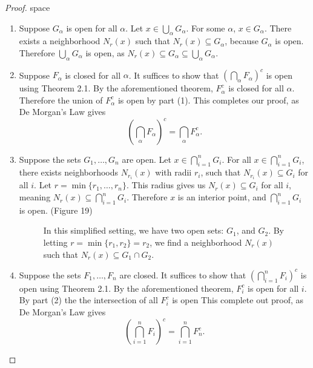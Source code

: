 \documentclass{article}
\theoremstyle{definition}
\begin{document}
\begin{proof}{\color{white}space}
	\begin{enumerate}
		\item Suppose $ G_\alpha $ is open for all $ \alpha $. Let $ x\in \bigcup_\alpha G_\alpha $. For some $ \alpha $, $ x\in G_\alpha $. There exists a neighborhood $ N_r(x) $ such that $ N_r(x)\subseteq G_\alpha $, because $ G_\alpha $ is open. Therefore $ \bigcup_\alpha G_\alpha $ is open, as $ N_r(x)\subseteq G_\alpha\subseteq \bigcup_\alpha G_\alpha $. 
		\item Suppose $ F_\alpha $ is closed for all $ \alpha $. It suffices to show that $ (\bigcap_\alpha F_\alpha)^c $ is open using Theorem 2.1. By the aforementioned theorem, $ F_\alpha^c $ is closed for all $ \alpha $. Therefore the union of $ F_\alpha^c $ is open by part (1). This completes our proof, as De Morgan's Law gives $$ \left(\bigcap_\alpha F_\alpha\right)^c=\bigcap_\alpha F_\alpha^c.$$
		\item Suppose the sets $ G_1,\ldots,G_n $ are open. Let $ x\in \bigcap_{i=1}^n G_i$. For all $ x\in\bigcap_{i=1}^n G_i $, there exists neighborhoods $ N_{r_i}(x) $ with radii $ r_i $, such that $ N_{r_i}(x)\subseteq G_i $ for all $ i $. Let $ r=\min\{r_1,\ldots,r_n\} $. This radius gives us $ N_r(x)\subseteq G_i $ for all $ i $, meaning $ N_r(x)\subseteq \bigcap_{i=1}^n G_i $. Therefore $ x $ is an interior point, and $ \bigcap_{i=1}^n G_i $ is open. (Figure 19)   
		\begin{figure}[h!]
			\centering
			\caption{In this simplified setting, we have two open sets: $ G_1 $, and $ G_2 $. By letting $ r=\min\{r_1,r_2\}=r_2 $, we find a neighborhood $ N_r(x) $ such that $ N_r(x)\subseteq G_1\cap G_2 $. }
		\end{figure}
		\item  Suppose the sets $ F_1,\ldots,F_n $ are closed. It suffices to show that $ (\bigcap_{i=1}^n F_i)^c $ is open using Theorem 2.1. By the aforementioned theorem, $ F_i^c $ is open for all $ i$. By part (2) the the intersection of all $ F_i^c $ is open This complete out proof, as De Morgan's Law gives 
		 $$ \left(\bigcap_{i=1}^n F_i\right)^c=\bigcap_{i=1}^n F_n^c.$$
	\end{enumerate}
\end{proof}
\end{document}
